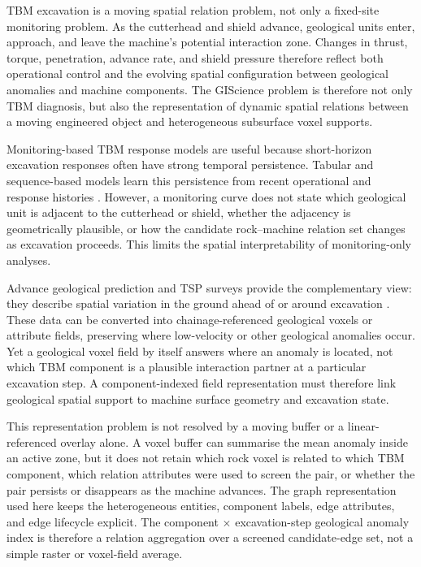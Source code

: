 TBM excavation is a moving spatial relation problem, not only a fixed-site
monitoring problem. As the cutterhead and shield advance, geological units
enter, approach, and leave the machine's potential interaction zone. Changes
in thrust, torque, penetration, advance rate, and shield pressure therefore
reflect both operational control and the evolving spatial configuration between
geological anomalies and machine components. The GIScience problem is therefore
not only TBM diagnosis, but also the representation of dynamic spatial
relations between a moving engineered object and heterogeneous subsurface
voxel supports.

Monitoring-based TBM response models are useful because short-horizon
excavation responses often have strong temporal persistence. Tabular and
sequence-based models learn this persistence from recent operational and
response histories
\citep{yagiz2008utilizing,hassanpour2010tbm,armaghani2018prediction,hochreiter1997long}.
However, a monitoring curve does not state which geological unit is adjacent to
the cutterhead or shield, whether the adjacency is geometrically plausible, or
how the candidate rock--machine relation set changes as excavation proceeds.
This limits the spatial interpretability of monitoring-only analyses.

Advance geological prediction and TSP surveys provide the complementary view:
they describe spatial variation in the ground ahead of or around excavation
\citep{li2019tunnel}. These data can be converted into chainage-referenced
geological voxels or attribute fields, preserving where low-velocity or other
geological anomalies occur. Yet a geological voxel field by itself answers
where an anomaly is located, not which TBM component is a plausible interaction
partner at a particular excavation step. A component-indexed field
representation must therefore link geological spatial support to machine
surface geometry and excavation state.

This representation problem is not resolved by a moving buffer or a
linear-referenced overlay alone. A voxel buffer can summarise the mean anomaly
inside an active zone, but it does not retain which rock voxel is related to
which TBM component, which relation attributes were used to screen the pair,
or whether the pair persists or disappears as the machine advances. The graph
representation used here keeps the heterogeneous entities, component labels,
edge attributes, and edge lifecycle explicit. The component $\times$
excavation-step geological anomaly index is therefore a relation aggregation over a screened
candidate-edge set, not a simple raster or voxel-field average.

